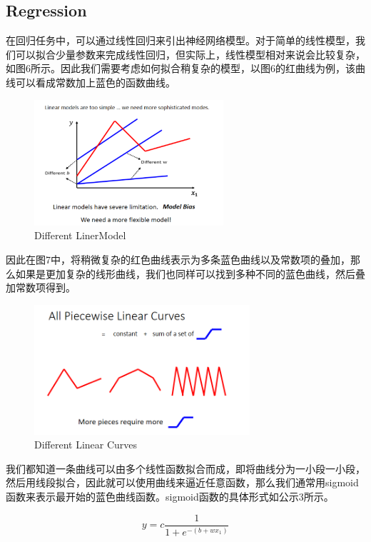 \documentclass{article}
\begin{document}
\subsection{Regression}
\indent 在回归任务中，可以通过线性回归来引出神经网络模型。对于简单的线性模型，我们可以拟合少量参数来完成线性回归，但实际上，线性模型相对来说会比较复杂，如图6所示。因此我们需要考虑如何拟合稍复杂的模型，以图6的红曲线为例，该曲线可以看成常数加上蓝色的函数曲线。\par
\begin{figure}[H]
    \centering
    \includegraphics[width=7cm]{picture/LinerModel.png}
    \caption{Different LinerModel}
    \label{fig:galxy}
\end{figure}
\indent 因此在图7中，将稍微复杂的红色曲线表示为多条蓝色曲线以及常数项的叠加，那么如果是更加复杂的线形曲线，我们也同样可以找到多种不同的蓝色曲线，然后叠加常数项得到。\par
\begin{figure}[H]
    \centering
    \includegraphics[width=8cm]{picture/LinearCurves.png}
    \caption{Different Linear Curves}
    \label{fig:galxy}
\end{figure}
\indent 我们都知道一条曲线可以由多个线性函数拟合而成，即将曲线分为一小段一小段，然后用线段拟合，因此就可以使用曲线来逼近任意函数，那么我们通常用sigmoid函数来表示最开始的蓝色曲线函数。sigmoid函数的具体形式如公示3所示。\par
\begin{equation}
    y = c \frac{1}{1 + e^{-(b + wx_{1})}}
\end{equation}
\end{document}
